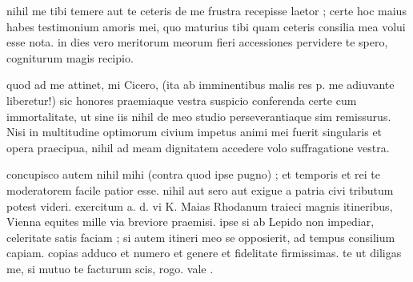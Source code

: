 


 nihil me tibi temere aut te ceteris de me frustra recepisse laetor ; certe hoc maius habes testimonium amoris mei, quo maturius tibi quam ceteris consilia mea volui esse nota. in dies vero meritorum meorum fieri accessiones pervidere te spero, cogniturum magis recipio.

 quod ad me attinet, mi Cicero, (ita ab imminentibus malis res p. me adiuvante liberetur!) sic honores praemiaque vestra suspicio conferenda certe cum immortalitate, ut sine iis nihil de meo studio perseverantiaque sim remissurus. Nisi in multitudine optimorum civium impetus animi mei fuerit singularis et opera praecipua, nihil ad meam dignitatem accedere volo suffragatione vestra.

 concupisco autem nihil mihi (contra quod ipse pugno) ; et temporis et rei te moderatorem facile patior esse. nihil aut sero aut exigue a patria civi tributum potest videri. exercitum a. d. vi K. Maias Rhodanum traieci magnis itineribus, Vienna equites mille via breviore praemisi. ipse si ab Lepido non impediar, celeritate satis faciam ; si autem itineri meo se opposierit, ad tempus consilium capiam. copias adduco et numero et genere et fidelitate firmissimas. te ut diligas me, si mutuo te facturum scis, rogo. vale .

